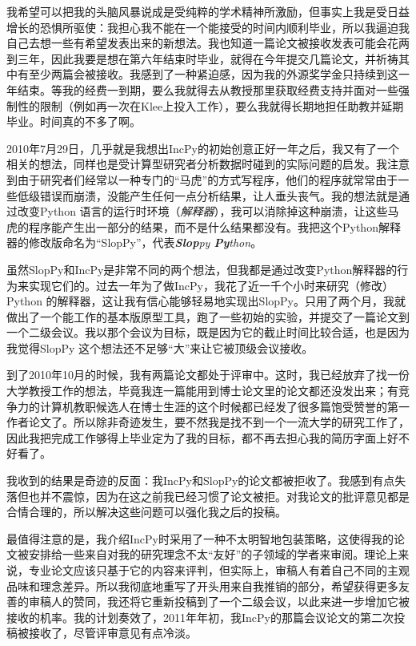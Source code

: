 \documentclass[letter,12pt]{book}
\begin{document}
\begin{CJK}{UTF8}{gbsn}
我希望可以把我的头脑风暴说成是受纯粹的学术精神所激励，但事实上我是受日益增长的恐惧所驱使：我担心我不能在一个能接受的时间内顺利毕业，所以我逼迫我自己去想一些有希望发表出来的新想法。我也知道一篇论文被接收发表可能会花两到三年，因此我要是想在第六年结束时毕业，就得在今年提交几篇论文，并祈祷其中有至少两篇会被接收。我感到了一种紧迫感，因为我的外源奖学金只持续到这一年结束。等我的经费一到期，要么我就得去从教授那里获取经费支持并面对一些强制性的限制（例如再一次在Klee上投入工作），要么我就得长期地担任助教并延期毕业。时间真的不多了啊。

2010年7月29日，几乎就是我想出IncPy的初始创意正好一年之后，我又有了一个相关的想法，同样也是受计算型研究者分析数据时碰到的实际问题的启发。我注意到由于研究者们经常以一种专门的“马虎”的方式写程序，他们的程序就常常由于一些低级错误而崩溃，没能产生任何一点分析结果，让人垂头丧气。我的想法就是通过改变Python 语言的运行时环境（\emph{解释器}），我可以消除掉这种崩溃，让这些马虎的程序能产生出一部分的结果，而不是什么结果都没有。我把这个Python解释器的修改版命名为“SlopPy”，代表\emph{\textbf{Slop}py \textbf{Py}thon}。

虽然SlopPy和IncPy是非常不同的两个想法，但我都是通过改变Python解释器的行为来实现它们的。过去一年为了做IncPy，我花了近一千个小时来研究（修改）Python 的解释器，这让我有信心能够轻易地实现出SlopPy。只用了两个月，我就做出了一个能工作的基本版原型工具，跑了一些初始的实验，并提交了一篇论文到一个二级会议。我以那个会议为目标，既是因为它的截止时间比较合适，也是因为我觉得SlopPy 这个想法还不足够“大”来让它被顶级会议接收。

\breakline

到了2010年10月的时候，我有两篇论文都处于评审中。这时，我已经放弃了找一份大学教授工作的想法，毕竟我连一篇能用到博士论文里的论文都还没发出来；有竞争力的计算机教职候选人在博士生涯的这个时候都已经发了很多篇饱受赞誉的第一作者论文了。所以除非奇迹发生，要不然我是找不到一个一流大学的研究工作了，因此我把完成工作够得上毕业定为了我的目标，都不再去担心我的简历字面上好不好看了。

我收到的结果是奇迹的反面：我IncPy和SlopPy的论文都被拒收了。我感到有点失落但也并不震惊，因为在这之前我已经习惯了论文被拒。对我论文的批评意见都是合情合理的，所以解决这些问题可以强化我之后的投稿。

最值得注意的是，我介绍IncPy时采用了一种不太明智地包装策略，这使得我的论文被安排给一些来自对我的研究理念不太“友好”的子领域的学者来审阅。理论上来说，专业论文应该只基于它的内容来评判，但实际上，审稿人有着自己不同的主观品味和理念差异。所以我彻底地重写了开头用来自我推销的部分，希望获得更多友善的审稿人的赞同，我还将它重新投稿到了一个二级会议，以此来进一步增加它被接收的机率。我的计划奏效了，2011年年初，我IncPy的那篇会议论文的第二次投稿被接收了，尽管评审意见有点冷淡。


\end{CJK}
\end{document}
